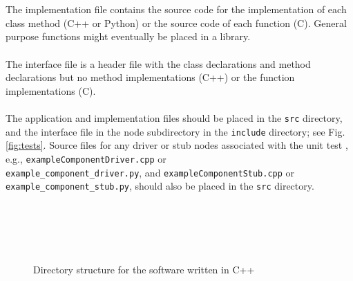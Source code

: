 \documentclass{CSSRforAfrica}
\newcommand{\blank}{~\\}
\begin{document}
\begin{appendices}
\blank
~
\blank
The implementation file contains the source code for the implementation of each class method (C++ or Python) or the source code of each function (C). General purpose functions might eventually be placed in a library.  
\blank
~
\blank
The interface file  is a header file with the class declarations and method  declarations but no method implementations (C++) or  the function  implementations (C). 
\blank
~
\blank
The application and implementation files should be placed in the {\small \verb+src+}  directory, and the interface file in the node subdirectory in the {\small \verb+include+} directory; see Fig. \ref{fig:tests}. Source files for any driver or stub nodes associated with the unit test , e.g., {\small \verb+exampleComponentDriver.cpp+} or \\ {\small \verb+example_component_driver.py+}, and {\small \verb+exampleComponentStub.cpp+}  or \\{\small \verb+example_component_stub.py+}, should also be placed in the {\small \verb+src+}  directory.
\blank
~
\blank


\begin{figure}[tb]
 
\begin{multicols}{3}

~~~~~~~~~~~~~~~~~~~~~

\vspace{20cm}

\columnbreak

{\small 
{}
}
\columnbreak


~~~~~~~~~~~~~~~~~~~~~

\end{multicols}

\cprotect\caption{Directory structure for the  software written in C++ }
\label{fig:c++directory}       

\end{figure}


\end{appendices}
\end{document}
